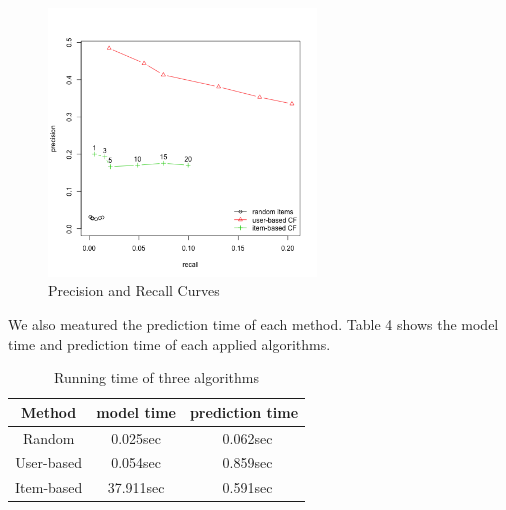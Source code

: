 \documentclass[conference]{IEEEtran}
\begin{document}
\begin{figure}
	\centering
	\includegraphics[width=2.8in]{precision_recall.png}
	\caption{Precision and Recall Curves}
	\label{fig:side:a}
\end{figure}

We also meatured the prediction time of each method. Table 4 shows the model time and prediction time of each applied algorithms. 
\begin{table}
	\caption{Running time of three algorithms}
	\begin{center}
		\begin{tabular}{ccc}
			\hline
			\rule{0pt}{12pt}Method  & \rule{0pt}{12pt}model time   &\rule{0pt}{12pt} prediction time\\
			\hline\rule{0pt}{12pt}
			Random    &   0.025sec & \ 	0.062sec \\
			User-based  &   0.054sec & \ 	0.859sec\\
			Item-based  &   37.911sec & \      0.591sec\\
			\hline
		\end{tabular}
	\end{center}
\end{table}
\end{document}
